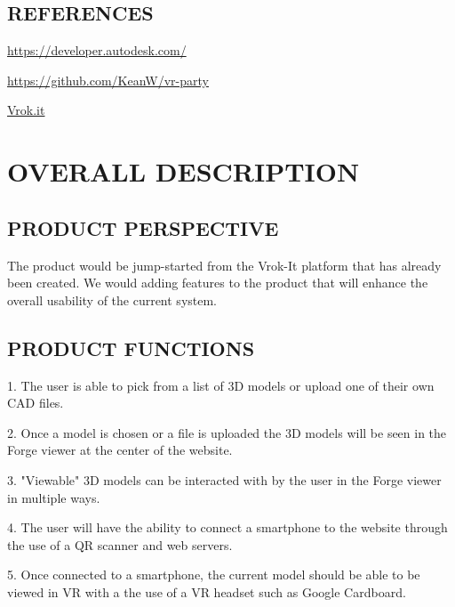 \documentclass[letterpaper, 10pt, draftclsnofoot, compsoc, onecolumn]{IEEEtran}
\begin{document}
\subsection[REFERENCES]{\rmfamily\bfseries\color{black}
REFERENCES}
{\color{black}
	\begin{flushleft}
	\url{https://developer.autodesk.com/}\newline

	\url{https://github.com/KeanW/vr-party}\newline

	\url{Vrok.it}\newline
	\end{flushleft}
}

\clearpage\section[OVERALL
DESCRIPTION]{\rmfamily\bfseries\color{black}
OVERALL DESCRIPTION}

\subsection[PRODUCT
PERSPECTIVE]{\rmfamily\bfseries\color{black}
PRODUCT PERSPECTIVE}
{\color{black}

{\color{black}
	The product would be jump-started from the Vrok-It platform that has already been created. 
	We would adding features to the product that will enhance the overall usability of the current system. 
}

\subsection[PRODUCT
FUNCTIONS]{\rmfamily\bfseries\color{black}
PRODUCT FUNCTIONS}
	\begin{flushleft}
	1. The user is able to pick from a list of 3D models or upload one of their own CAD files. \newline

	2. Once a model is chosen or a file is uploaded the 3D models will be seen in the Forge viewer at the 
	center of the website.\newline

	3. "Viewable" 3D models can be interacted with by the user in the Forge viewer in multiple ways.\newline

	4. The user will have the ability to connect a smartphone to the website through the use of a QR scanner
	and web servers. \newline

	5. Once connected to a smartphone, the current model should be able to be viewed in VR with a the use
	of a VR headset such as Google Cardboard. 
	\end{flushleft}
}
\end{document}
